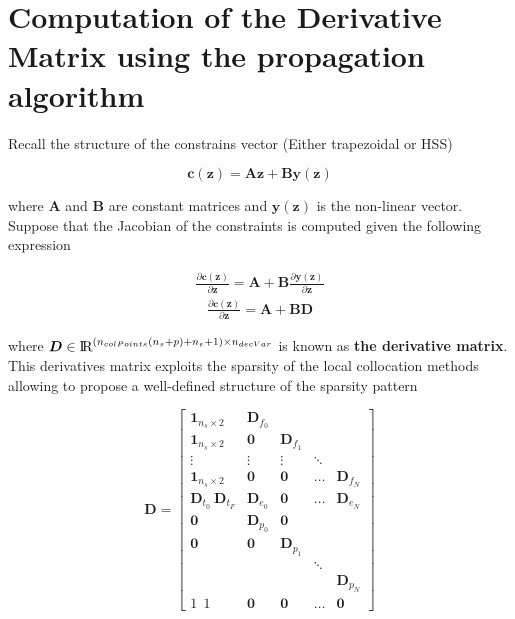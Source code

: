 \documentclass[12pt]{article}
\newcommand{\real}{\mbox{\rm I$\!$R}}
\begin{document}
\newpage

\section{Computation of the Derivative Matrix using the propagation algorithm}

Recall the structure of the constrains vector (Either trapezoidal or HSS)

\begin{equation}
    \bm{c}(\bm{z})=\bm{A}\bm{z} + \bm{B}\bm{\bm{y}(\bm{z})}
\end{equation}

\noindent where $\bm{A}$ and $\bm{B}$ are constant matrices and $\bm{y}(\bm{z})$ is the non-linear vector. Suppose that the Jacobian of the constraints is computed given the following expression

\begin{eqnarray}
   \frac{\partial \bm{c}(\bm{z})}{\partial \bm{z}} =\bm{A} + \bm{B}\frac{\partial \bm{y}(\bm{z})}{\partial \bm{z}}
\end{eqnarray}
\begin{eqnarray}
   \frac{\partial \bm{c}(\bm{z})}{\partial \bm{z}} =\bm{A} + \bm{B}\bm{D}
\end{eqnarray}

\noindent where $\bm{D} \in \real^{(n_{colPoints}(n_s+p)+n_e+1) \times n_{decVar}} $ is known as \textbf{the derivative matrix}. This derivatives matrix exploits the sparsity of the local collocation methods allowing to propose a well-defined structure of the sparsity pattern

\begin{equation} \label{mat:D_structure}
\bm{D}=\begin{bmatrix}
\bm{1}_{n_s \times 2} & \bm{D}_{f_0} &  &  & \\ 
\bm{1}_{n_s \times 2} & \bm{0} & \bm{D}_{f_1} &  & \\ 
\vdots  & \vdots  & \vdots &  \ddots& \\ 
\bm{1}_{n_s \times 2} & \bm{0} & \bm{0} & \hdots & \bm{D}_{f_N}\\ 
\bm{D}_{t_0} \ \bm{D}_{t_F} &  \bm{D}_{e_0}& \bm{0} & \hdots &\bm{D}_{e_N} \\ 
\bm{0} & \bm{D}_{p_0} & \bm{0} &  & \\ 
\bm{0} & \bm{0} &\bm{D}_{p_1}  &  & \\ 
 &  &  &  \ddots& \\ 
 &  &  &  &\bm{D}_{p_N} \\ 
1 \ \ 1 & \bm{0} & \bm{0} & \hdots & \bm{0} 
\end{bmatrix}
\end{equation}
\end{document}
